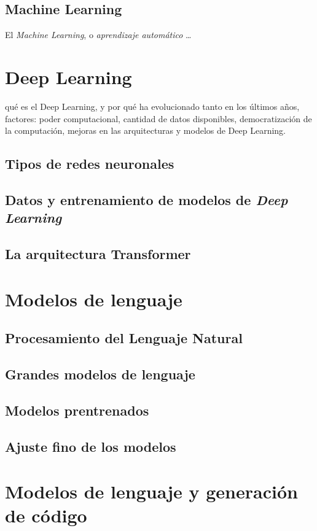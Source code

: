 \subsection{Machine Learning}

El \textit{Machine Learning}, o \textit{aprendizaje automático} \dots


\section{Deep Learning}

qué es el Deep Learning, y por qué ha evolucionado tanto en los últimos años, factores: poder computacional, cantidad de datos disponibles, democratización de la computación, mejoras en las arquitecturas y modelos de Deep Learning.


\subsection{Tipos de redes neuronales}
\subsection{Datos y entrenamiento de modelos de \textit{Deep Learning}}
\subsection{La arquitectura Transformer}

\section{Modelos de lenguaje}

\subsection{Procesamiento del Lenguaje Natural}
\subsection{Grandes modelos de lenguaje}
\subsection{Modelos prentrenados}
\subsection{Ajuste fino de los modelos}

\section{Modelos de lenguaje y generación de código}
